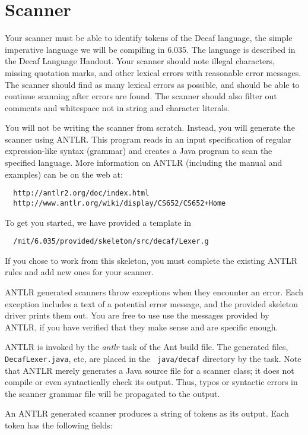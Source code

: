 \section*{Scanner}

Your scanner must be able to identify tokens of the Decaf language,
the simple imperative language we will be compiling in 6.035.  The
language is described in the Decaf Language Handout.  Your scanner should note
illegal characters, missing quotation marks, and other lexical
errors with reasonable error messages.  The scanner should find as
many lexical errors as possible, and should be able to continue
scanning after errors are found.  The scanner should also filter out
comments and whitespace not in string and character literals.

You will not be writing the scanner from scratch. Instead, you will
generate the scanner using ANTLR. This program reads in an input
specification of regular expression-like syntax (grammar) and
creates a Java program to scan the specified language.  More
information on ANTLR (including the manual and examples) can be on
the web at:
\begin{verbatim}
  http://antlr2.org/doc/index.html
  http://www.antlr.org/wiki/display/CS652/CS652+Home
  \end{verbatim}
To get you started, we have provided a template in
\begin{verbatim}
  /mit/6.035/provided/skeleton/src/decaf/Lexer.g
\end{verbatim}
If you chose to work from this skeleton, you must complete the
existing ANTLR rules and add new ones for your scanner.

ANTLR generated scanners throw exceptions when they encounter an
error. Each exception includes a text of a potential error message,
and the provided skeleton driver prints them out. You are free to
use use the messages provided by ANTLR, if you have verified that
they make sense and are specific enough.

ANTLR is invoked by the {\it antlr} task of the Ant build file.  The
generated files, {\tt DecafLexer.java}, etc, are placed in the {\tt
java/decaf} directory by the task.  Note that ANTLR merely generates
a Java source file for a scanner class; it does not compile or even
syntactically check its output. Thus, typos or syntactic errors in
the scanner grammar file will be propagated to the output.

An ANTLR generated scanner produces a string of tokens as its
output. Each token has the following fields:

